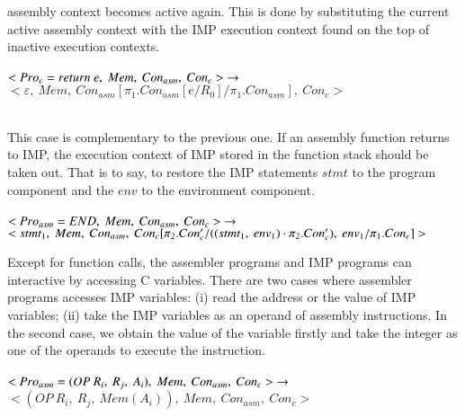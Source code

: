 \documentclass[letterpaper, 10 pt, conference]{IEEEtran}
\begin{document}
assembly context becomes active again. This is done by substituting the current active
assembly context with the IMP execution context found on the top of inactive execution
contexts.\\ \\
$<Pro_c=return~e,~Mem,~Con_{asm},~Con_c>~\rightarrow\\ \\$
$<\varepsilon,~Mem,~Con_{asm}[\pi_1.Con_{asm}[e/R_0]/\pi_1.Con_{asm}],~Con_c>$\\ \\
\par This case is complementary to the previous one. If an assembly function returns to IMP, the execution context of IMP stored in the function stack should be taken out. That is to say, to restore the IMP statements $stmt$ to the program component and the $env$ to the environment component.  \\ \\
$<Pro_{asm}=END,~Mem,~Con_{asm},~Con_c>~\rightarrow\\ \\$
$<stmt_1,~Mem,~Con_{asm},~Con_c[\pi_2.Con_c'/((stmt_1,~env_1)\cdot \pi_2.Con_c'),~env_1/\pi_1.Con_c]>\\ \\$
\par Except for function calls, the assembler programs and IMP programs can interactive by accessing C variables. There are two cases where assembler programs accesses IMP variables: (i) read the address or the value of IMP variables; (ii) take the IMP variables as an operand of assembly instructions. In the second case, we obtain the value of the variable firstly and take the integer as one of the operands to execute the instruction.\\ \\
$<Pro_{asm}=(OP~R_i,~R_j,~A_i),~Mem,~Con_{asm},~Con_c>~\rightarrow\\ \\$
$<(OP~R_i,~R_j,~Mem(A_i)),~Mem,~Con_{asm},~Con_c>$\\ \\
\end{document}
